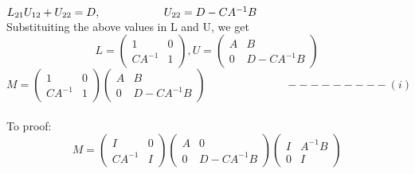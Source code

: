 \documentclass[12pt, oneside]{article}   	%
\begin{document}
\begin{enumerate}
\begin{enumerate}
\hspace{3cm}$L_{21}U_{12}+U_{22} =D, 
\hspace{2cm}U_{22} =D-CA^{-1}B\\
$\\
Substituiting the above values in L and U, we get\\
$$
L= \left(\begin{array}{cc} 1 & 0\\ CA^{-1}& 1 \end{array}\right) , U=
\left(\begin{array}{cc}A & B\\ 0& D-CA^{-1}B \end{array}\right)
$$ 
$$
M= \left(\begin{array}{cc} 1 & 0\\ CA^{-1}& 1 \end{array}\right) 
\left(\begin{array}{cc}A & B\\ 0& D-CA^{-1}B \end{array}\right) \hspace{3cm}---------(i)
$$ \\

To proof:\\
$$
M = \left(\begin{array}{cc} I & 0\\ CA^{-1} & I \end{array}\right)
\left(\begin{array}{cc} A & 0\\ 0& D-CA^{-1}B \end{array}\right)
\left(\begin{array}{cc} I & A^{-1}B \\0& I \end{array}\right)
$$\\


\end{enumerate}
\end{enumerate}
\end{document}
